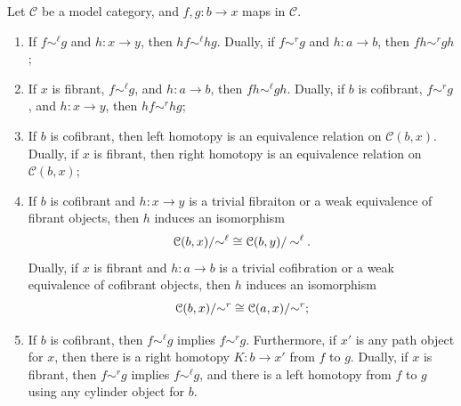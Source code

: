\begin{proposition}\label{1.2.12}
	Let $\mathcal{C} $ be a model category, and $f,g : b \to x$ maps in $\mathcal{C} $.
	\begin{enumerate}
		\item If $f\sim ^\ell g$ and $h : x \to y$, then $hf\sim^\ell hg$. Dually, if $f\sim ^rg$ and $h : a \to b$, then $fh\sim ^rgh$;
		\item If $x$ is fibrant, $f\sim ^\ell g$, and $h : a \to b$, then $fh\sim ^\ell gh$. Dually, if $b$ is cofibrant, $f\sim ^rg$, and $h : x \to y$, then $hf\sim ^rhg$;
		\item If $b$ is cofibrant, then left homotopy is an equivalence relation on $\mathcal{C} (b,x)$. Dually, if $x$ is fibrant, then right homotopy is an equivalence relation on $\mathcal{C} (b,x)$;
		\item If $b$ is cofibrant and $h : x \to y$ is a trivial fibraiton or a weak equivalence of fibrant objects, then $h$ induces an isomorphism
			\[
				\mathcal{C} (b,x) /\mathbin{\sim}^\ell  \cong \mathcal{C} (b,y) /\mathbin{\sim}^\ell 
			.\]
			Dually, if $x$ is fibrant and $h : a \to b$ is a trivial cofibration or a weak equivalence of cofibrant objects, then $h$ induces an isomorphism
			\[
				\mathcal{C} (b,x) / \mathbin{\sim} ^r\cong \mathcal{C} (a,x) /\mathbin{\sim}^r
			;\]
		\item If $b$ is cofibrant, then $f\sim ^\ell g$ implies $f\sim ^rg$. Furthermore, if $x'$ is any path object for $x$, then there is a right homotopy $K : b \to x'$ from $f$ to $g$. Dually, if $x$ is fibrant, then $f\sim ^rg$ implies $f\sim ^\ell g$, and there is a left homotopy from $f$ to $g$ using any cylinder object for $b$.
	\end{enumerate}
\end{proposition}
